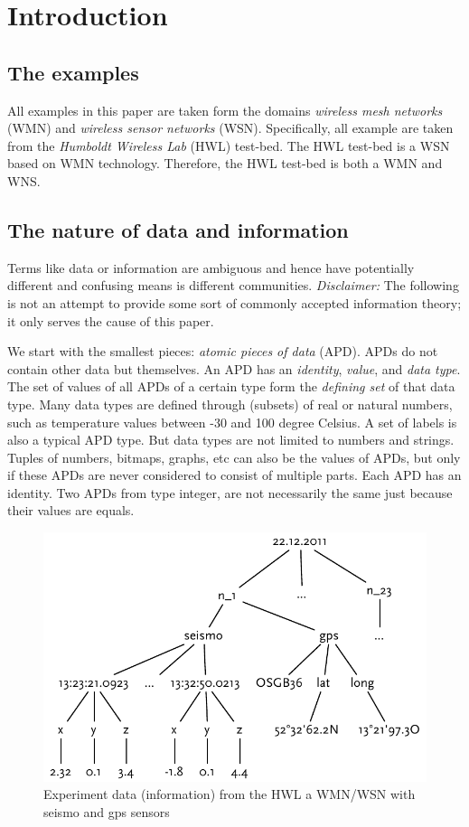 \section{Introduction}\label{sec:introduction}

\subsection{The examples}

All examples in this paper are taken form the domains \emph{wireless mesh networks} (WMN) and \emph{wireless sensor networks} (WSN). Specifically, all example are taken from the \emph{Humboldt Wireless Lab} (HWL) test-bed. The HWL test-bed is a WSN based on WMN technology. Therefore, the HWL test-bed is both a WMN and WNS.

\subsection{The nature of data and information}\label{sec:information}

Terms like data or information are ambiguous and hence have potentially different and confusing means is different communities. \emph{Disclaimer:} The following is not an attempt to provide some sort of commonly accepted information theory; it only serves the cause of this paper.

We start with the smallest pieces: \emph{atomic pieces of data} (APD). APDs do not contain other data but themselves. An APD has an \emph{identity}, \emph{value}, and \emph{data type}. The set of values of all APDs of a certain type form the \emph{defining set} of that data type. Many data types are defined through (subsets) of real or natural numbers, such as temperature values between -30 and 100 degree Celsius. A set of labels is also a typical APD type. But data types are not limited to numbers and strings. Tuples of numbers, bitmaps, graphs, etc can also be the values of APDs, but only if these APDs are never considered to consist of multiple parts. Each APD has an identity. Two APDs from type integer, are not necessarily the same just because their values are equals.

\begin{figure}
  \centering
  \includegraphics[width=0.65\linewidth]{figures/example_information_graph}
  \caption{Experiment data (information) from the HWL a WMN/WSN with seismo and gps sensors}
  \label{fig:example_information_graph}
\end{figure}

